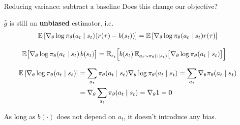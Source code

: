 \documentclass[usenames,dvipsnames,notes,11pt,aspectratio=169,hyperref={colorlinks=true, linkcolor=blue}]{beamer}
\begin{document}
\begin{frame}
    {Reducing variance: subtract a baseline}
    Does this change our objective?\\
    \begin{wideitemize}
    \item $\hat{g}$ is still an {\bf unbiased} estimator, i.e.
    \begin{align*}
        \mathbb{E}\left[ \nabla_\theta\log\pi_\theta(a_t\mid s_t)(r(\tau) - b(s_t)) \right]
        =\mathbb{E}\left[ \nabla_\theta\log\pi_\theta(a_t\mid s_t)r(\tau) \right]
    \end{align*}
            \vspace{-2em}

            \pause
            \begin{align*}
\mathbb{E}\bigl[\nabla_\theta \log \pi_\theta(a_t \mid s_t)\,b(s_t)\bigr]
&= \mathbb{E}_{s_t}\Bigl[
    b(s_t)\,
    \mathbb{E}_{a_t \sim \pi_\theta(\cdot\mid s_t)}
      \bigl[\nabla_\theta \log \pi_\theta(a_t \mid s_t)\bigr]
\Bigr]
\end{align*}
            \vspace{-2em}

\pause
            \begin{align*}
                \mathbb{E}\left[ \nabla_\theta\log\pi_\theta(a_t\mid s_t) \right]
                &= \sum_{a_t} \pi_\theta(a_t\mid s_t) \nabla_\theta\log\pi_\theta(a_t\mid s_t)
                = \sum_{a_t} \nabla_\theta \pi_\theta(a_t\mid s_t)\\
                &= \nabla_\theta \sum_{a_t} \pi_\theta(a_t\mid s_t) = \nabla_\theta 1 = 0
            \end{align*}
        \item As long as $b(\cdot)$ does not depend on $a_t$, it doesn't introduce any bias.
    \end{wideitemize}
\end{frame}
\end{document}
